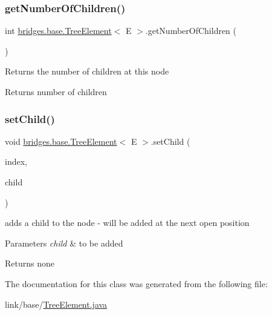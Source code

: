 \subsubsection{\texorpdfstring{get\+Number\+Of\+Children()}{getNumberOfChildren()}}
{\footnotesize\ttfamily int \hyperlink{classbridges_1_1base_1_1_tree_element}{bridges.\+base.\+Tree\+Element}$<$ E $>$.get\+Number\+Of\+Children (\begin{DoxyParamCaption}{ }\end{DoxyParamCaption})}

Returns the number of children at this node

\begin{DoxyReturn}{Returns}
number of children 
\end{DoxyReturn}
\hypertarget{classbridges_1_1base_1_1_tree_element_aefafebb19d64398d150e464e4361ddf0}{}\label{classbridges_1_1base_1_1_tree_element_aefafebb19d64398d150e464e4361ddf0} 
\subsubsection{\texorpdfstring{set\+Child()}{setChild()}}
{\footnotesize\ttfamily void \hyperlink{classbridges_1_1base_1_1_tree_element}{bridges.\+base.\+Tree\+Element}$<$ E $>$.set\+Child (\begin{DoxyParamCaption}\item[{int}]{index,  }\item[{\hyperlink{classbridges_1_1base_1_1_tree_element}{Tree\+Element}$<$ E $>$}]{child }\end{DoxyParamCaption})}

adds a child to the node -\/ will be added at the next open position


\begin{DoxyParams}{Parameters}
{\em child} & to be added\\
\hline
\end{DoxyParams}
\begin{DoxyReturn}{Returns}
none 
\end{DoxyReturn}


The documentation for this class was generated from the following file\+:\begin{DoxyCompactItemize}
\item 
link/base/\hyperlink{_tree_element_8java}{Tree\+Element.\+java}\end{DoxyCompactItemize}
